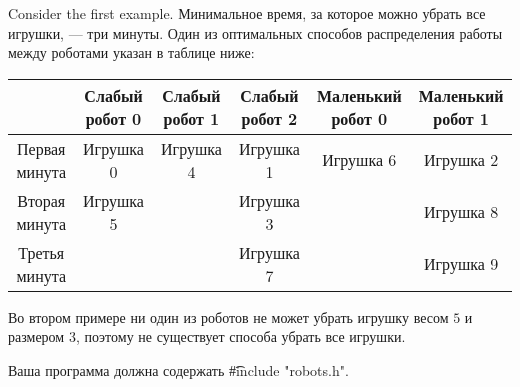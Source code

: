 Consider the first example.
Минимальное время, за которое можно убрать все игрушки, --- три минуты. Один из оптимальных способов распределения работы между роботами указан в таблице ниже:
\begin{center}
\begin{tabular}{ |c|c|c|c|c|c| }
\hline
 & \parbox{2cm}{\centering Слабый робот 0} & \parbox{2cm}{\centering \vspace{2mm}Слабый робот 1\\\vspace{2mm}} & \parbox{2cm}{\centering \vspace{2mm}Слабый робот 2\\\vspace{2mm}} & \parbox{2cm}{\centering \vspace{2mm}Маленький робот 0\\\vspace{2mm}} & \parbox{2cm}{\centering \vspace{2mm}Маленький робот 1\\\vspace{2mm}}\\
\hline
Первая минута & Игрушка 0 & Игрушка 4 & Игрушка 1 & Игрушка 6 & Игрушка 2\\
\hline
Вторая минута & Игрушка 5 & & Игрушка 3 & & Игрушка 8\\
\hline
Третья минута & & & Игрушка 7 & & Игрушка 9\\
\hline
\end{tabular}
\end{center}
Во втором примере ни один из роботов не может убрать игрушку весом $5$ и размером $3$, поэтому не существует способа убрать все игрушки.

Ваша программа должна содержать \t{\#include "robots.h"}.